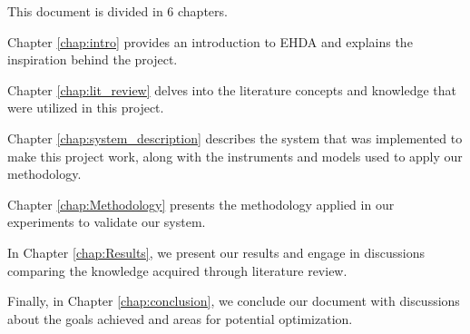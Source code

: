 This document is divided in 6 chapters. 

Chapter \ref{chap:intro} provides an introduction to EHDA and explains the inspiration behind the project.

Chapter \ref{chap:lit_review} delves into the literature concepts and knowledge that were utilized in this project.

Chapter \ref{chap:system_description} describes the system that was implemented to make this project work, along with the instruments and models used to apply our methodology.

Chapter \ref{chap:Methodology} presents the methodology applied in our experiments to validate our system.

In Chapter \ref{chap:Results}, we present our results and engage in discussions comparing the knowledge acquired through literature review.

Finally, in Chapter \ref{chap:conclusion}, we conclude our document with discussions about the goals achieved and areas for potential optimization.
